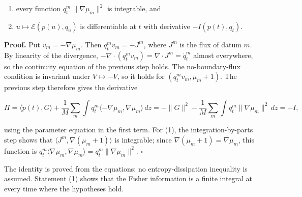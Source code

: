 \documentclass[11pt,a4paper]{report}
\begin{document}
\begin{enumerate}


\item every function \(q^m_t\,\|\nabla\mu_m\|^2\) is integrable, and

\item \(u\mapsto\mathcal E(p(u),q_u)\) is differentiable at \(t\) with derivative \(-I(p(t),q_t)\).

\end{enumerate}



\textbf{Proof.} Put \(v_m=-\nabla\mu_m\). Then \(q^m_tv_m=-J^m\), where \(J^m\) is the flux of datum \(m\). By linearity of the divergence, \(-\nabla\cdot(q^m_tv_m)=\nabla\cdot J^m=\dot q^m_t\) almost everywhere, so the continuity equation of the previous step holds. The no-boundary-flux condition is invariant under \(V\mapsto-V\), so it holds for \((q^m_tv_m,\mu_m+1)\). The previous step therefore gives the derivative


\[\Pi=\langle\dot p(t),G\rangle+\frac1M\sum_m\int q^m_t\langle-\nabla\mu_m,\nabla\mu_m\rangle\,dz=-\|G\|^2-\frac1M\sum_m\int q^m_t\|\nabla\mu_m\|^2\,dz=-I,\]


using the parameter equation in the first term. For (1), the integration-by-parts step shows that \(\langle J^m,\nabla(\mu_m+1)\rangle\) is integrable; since \(\nabla(\mu_m+1)=\nabla\mu_m\), this function is \(q^m_t\langle\nabla\mu_m,\nabla\mu_m\rangle=q^m_t\|\nabla\mu_m\|^2\). \(\square\)




The identity is proved from the equations; no entropy-dissipation inequality is assumed. Statement (1) shows that the Fisher information is a finite integral at every time where the hypotheses hold.
\end{document}
